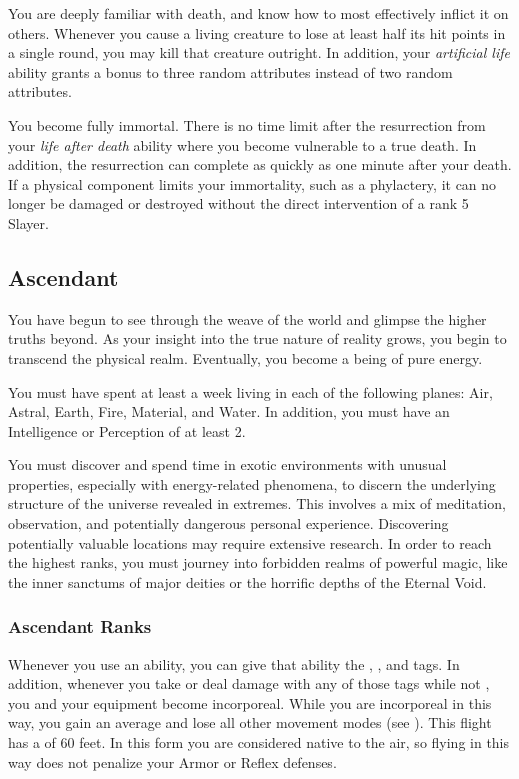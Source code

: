        You are deeply familiar with death, and know how to most effectively inflict it on others.
      Whenever you cause a living creature to lose at least half its hit points in a single round, you may kill that creature outright.
      In addition, your \textit{artificial life} ability grants a bonus to three random attributes instead of two random attributes.

       You become fully immortal. There is no time limit after the resurrection from your \textit{life after death} ability where you become vulnerable to a true death. In addition, the resurrection can complete as quickly as one minute after your death. If a physical component limits your immortality, such as a phylactery, it can no longer be damaged or destroyed without the direct intervention of a rank 5 Slayer.

  \subsection{Ascendant}
    You have begun to see through the weave of the world and glimpse the higher truths beyond.
    As your insight into the true nature of reality grows, you begin to transcend the physical realm.
    Eventually, you become a being of pure energy.

     You must have spent at least a week living in each of the following planes: Air, Astral, Earth, Fire, Material, and Water.
    In addition, you must have an Intelligence or Perception of at least 2.

     You must discover and spend time in exotic environments with unusual properties, especially with energy-related phenomena, to discern the underlying structure of the universe revealed in extremes.
    This involves a mix of meditation, observation, and potentially dangerous personal experience.
    Discovering potentially valuable locations may require extensive research.
    In order to reach the highest ranks, you must journey into forbidden realms of powerful magic, like the inner sanctums of major deities or the horrific depths of the Eternal Void.

    \subsubsection{Ascendant Ranks}

       Whenever you use an ability, you can give that ability the \atCold, \atElectricity, and \atFire tags.
      In addition, whenever you take or deal damage with any of those tags while not , you and your equipment  become incorporeal.
      While you are incorporeal in this way, you gain an average  and lose all other movement modes (see ).
      This flight has a  of 60 feet.
      In this form you are considered native to the air, so flying in this way does not penalize your Armor or Reflex defenses.

